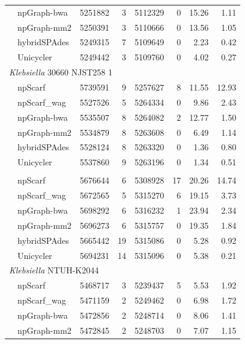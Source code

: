 \documentclass[10pt,twocolumn,twoside]{genpaper}
\begin{document}
\begin{longtable}[!hpt]{llcrrrrr}
\rowcolor{Gray}
& npGraph-bwa & 5251882  &  3  &  5112329  &  0  &  15.26 & 1.11\\*
\rowcolor{Gray}
& npGraph-mm2 &  5250391 &  3  &  5110666  &  0  &  13.56 & 1.05\\*
\rowcolor{Gray}
& hybridSPAdes & 5249315  &  7  &  5109649  &  0  &  2.23 &  0.42\\*
\rowcolor{Gray}
& Unicycler & 5249442  &  3  &  5109760  &  0  & 4.02 & 0.27 \\
\hline
\multicolumn{8}{l}{\emph{Klebsiella} 30660 NJST258 1} \\* %
\nobreakmidrule
& npScarf & 5739591  &  9  &  5257627  &  8  & 11.55  & 12.93\\*
& npScarf\_wag & 5527526  &  5  &  5264334  &  0  & 9.86  & 2.43\\*
& npGraph-bwa & 5535507  &  8  &  5264082  &  2  & 12.77  & 1.50\\*
& npGraph-mm2 & 5534879  &  8  &  5263608  &  0  & 6.49  & 1.14\\*
& hybridSPAdes &  5528124 & 8   &  5263320  &  0  & 1.36  & 0.80 \\*
& Unicycler & 5537860  &  9  &  5263196  &  0  & 1.34  & 0.51 \\
\hline
\rowcolor{Gray}
\multicolumn{8}{l}{\emph{Klebsiella} MGH 78578} \\* %
\nobreakmidrule
\rowcolor{Gray}
& npScarf &  5676644 &  6  &  5308928  &  17  & 20.26  & 14.74\\*
\rowcolor{Gray}
& npScarf\_wag & 5672565  &  5  &  5315270  &  6  &  19.15 & 3.73\\*
\rowcolor{Gray}
& npGraph-bwa &  5698292 &  6  &  5316232  &  1  & 23.94  & 2.34\\*
\rowcolor{Gray}
& npGraph-mm2 & 5696273  &  6  &  5315757  &  0  &  19.35 & 1.84\\*
\rowcolor{Gray}
& hybridSPAdes &  5665442 &  19  &  5315086  &  0  & 5.28  &  0.92\\*
\rowcolor{Gray}
& Unicycler &  5694231 &  14  &  5315096  &  0  & 5.38 &  0.21\\
\hline
\multicolumn{8}{l}{\emph{Klebsiella} NTUH-K2044} \\* %
\nobreakmidrule
& npScarf & 5468717  &  3  &  5239437  &  5  & 5.53  &  1.92\\*
& npScarf\_wag & 5471159  &  2  &  5249462  &  0  &  6.98 &  1.72\\*
& npGraph-bwa & 5472856  &  2  &  5248714  & 0  & 8.06  &  1.41\\*
& npGraph-mm2 &  5472845 &  2  &  5248703  &  0 &  7.07 &  1.15\\*

\end{longtable}
\end{document}
